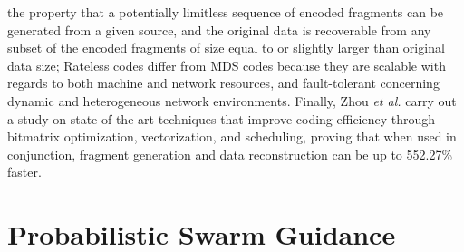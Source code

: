\documentclass[runningheads]{llncs}
\begin{document}
the property that a potentially limitless sequence of encoded fragments can be generated from a given source, and the original data is recoverable from any subset of the encoded fragments of size equal to or slightly larger than original data size; Rateless codes differ from MDS codes because they are scalable with regards to both machine and network resources, and fault-tolerant concerning dynamic and heterogeneous network environments. Finally, Zhou \textit{et al.} \cite{fast_coding} carry out a study on state of the art techniques that improve coding efficiency through bitmatrix optimization, vectorization, and scheduling, proving that when used in conjunction, fragment generation and data reconstruction can be up to 552.27\% faster.

\section{Probabilistic Swarm Guidance}\label{sec:psg}
\end{document}
